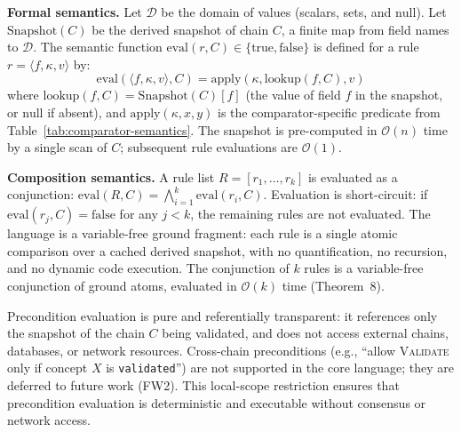 \textbf{Formal semantics.} Let $\mathcal{D}$ be the domain of values (scalars, sets, and $\text{null}$). Let $\text{Snapshot}(C)$ be the derived snapshot of chain $C$, a finite map from field names to $\mathcal{D}$. The semantic function $\text{eval}(r, C) \in \{\text{true}, \text{false}\}$ is defined for a rule $r = \langle f, \kappa, v \rangle$ by:
\begin{equation}
    \text{eval}(\langle f, \kappa, v \rangle, C) = \text{apply}(\kappa, \text{lookup}(f, C), v)
\end{equation}
where $\text{lookup}(f, C) = \text{Snapshot}(C)[f]$ (the value of field $f$ in the snapshot, or $\text{null}$ if absent), and $\text{apply}(\kappa, x, y)$ is the comparator-specific predicate from Table~\ref{tab:comparator-semantics}. The snapshot is pre-computed in $\mathcal{O}(n)$ time by a single scan of $C$; subsequent rule evaluations are $\mathcal{O}(1)$.

\textbf{Composition semantics.} A rule list $R = [r_1, \ldots, r_k]$ is evaluated as a conjunction: $\text{eval}(R, C) = \bigwedge_{i=1}^{k} \text{eval}(r_i, C)$. Evaluation is short-circuit: if $\text{eval}(r_j, C) = \text{false}$ for any $j < k$, the remaining rules are not evaluated. The language is a variable-free ground fragment: each rule is a single atomic comparison over a cached derived snapshot, with no quantification, no recursion, and no dynamic code execution. The conjunction of $k$ rules is a variable-free conjunction of ground atoms, evaluated in $\mathcal{O}(k)$ time (Theorem~8).

Precondition evaluation is pure and referentially transparent: it references only the snapshot of the chain $C$ being validated, and does not access external chains, databases, or network resources. Cross-chain preconditions (e.g., ``allow \textsc{Validate} only if concept $X$ is \texttt{validated}'') are not supported in the core language; they are deferred to future work (FW2). This local-scope restriction ensures that precondition evaluation is deterministic and executable without consensus or network access.

